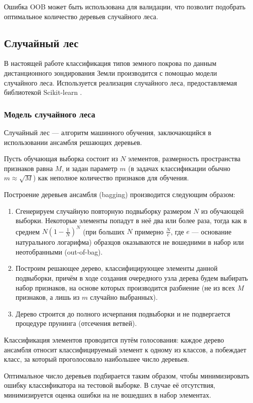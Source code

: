 \documentclass[14pt, a4paper, oneside]{extarticle}
\begin{document}
Ошибка OOB может быть использована для валидации, что позволит подобрать оптимальное количество деревьев случайного леса.

\subsection{Случайный лес}
В настоящей работе классификация типов земного покрова по данным дистанционного зондирования Земли производится с помощью модели случайного леса. Используется реализация случайного леса, предоставляемая библиотекой Scikit-learn \cite{sklearn}.

\subsubsection{Модель случайного леса}
Случайный лес --- алгоритм машинного обучения, заключающийся в использовании ансамбля решающих деревьев.

Пусть обучающая выборка состоит из $N$ элементов, размерность пространства признаков равна $M$, и задан параметр $m$ (в задачах классификации обычно $m \approx \sqrt{M}$) как неполное количество признаков для обучения.

Построение деревьев ансамбля (bagging) производится следующим образом:
\begin{enumerate}
    \item Сгенерируем случайную повторную подвыборку размером $N$ из обучающей выборки. Некоторые элементы попадут в неё два или более раза, тогда как в среднем $N(1-\frac{1}{N})^N$ (при больших $N$ примерно $\frac{N}{e}$, где $e$ --- основание натурального логарифма) образцов оказываются не вошедними в набор или неотобранными (out-of-bag).
    \item Построим решающее дерево, классифицирующее элементы данной подвыборки, причём в ходе создания очередного узла дерева будем выбирать набор признаков, на основе которых производится разбиение (не из всех $M$ признаков, а лишь из $m$ случайно выбранных).
    \item Дерево строится до полного исчерпания подвыборки и не подвергается процедуре прунинга (отсечения ветвей).
\end{enumerate}

Классификация элементов проводится путём голосования: каждое дерево ансамбля относит классифицируемый элемент к одному из классов, а побеждает класс, за который проголосовало наибольшее число деревьев.

Оптимальное число деревьев подбирается таким образом, чтобы минимизировать ошибку классификатора на тестовой выборке. В случае её отсутствия, минимизируется оценка ошибки на не вошедших в набор элементах.
\end{document}

